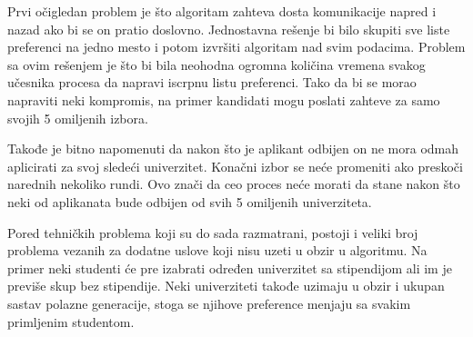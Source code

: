 \documentclass[a4paper]{article}
\begin{document}
Prvi očigledan problem je što algoritam zahteva dosta komunikacije napred i nazad ako bi se on pratio doslovno. Jednostavna rešenje bi bilo skupiti sve liste preferenci na jedno mesto i potom izvršiti algoritam nad svim podacima. Problem sa ovim rešenjem je što bi bila neohodna ogromna količina vremena svakog učesnika procesa da napravi iscrpnu listu preferenci. Tako da bi se morao napraviti neki kompromis, na primer kandidati mogu poslati zahteve za samo svojih 5 omiljenih izbora.

Takođe je bitno napomenuti da nakon što je aplikant odbijen on ne mora odmah aplicirati za svoj sledeći univerzitet. Konačni izbor se neće promeniti ako preskoči narednih nekoliko rundi. Ovo znači da ceo proces neće morati da stane nakon što neki od aplikanata bude odbijen od svih 5 omiljenih univerziteta.

Pored tehničkih problema koji su do sada razmatrani, postoji i veliki broj problema vezanih za dodatne uslove koji nisu uzeti u obzir u algoritmu. Na primer neki studenti će pre izabrati određen univerzitet sa stipendijom ali im je previše skup bez stipendije. Neki univerziteti takođe uzimaju u obzir i ukupan sastav polazne generacije, stoga se njihove preference menjaju sa svakim primljenim studentom.

\appendix
 

\end{document}
